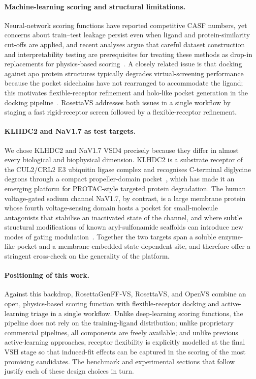 \documentclass[11pt]{article}
\begin{document}
\paragraph{Machine-learning scoring and structural limitations.}
Neural-network scoring functions have reported competitive CASF numbers,
yet concerns about train--test leakage persist even when ligand and
protein-similarity cut-offs are applied, and recent analyses argue that
careful dataset construction and interpretability testing are prerequisites
for treating these methods as drop-in replacements for physics-based
scoring~\citep{scantlebury2023pointvs}. A closely related issue is that
docking against apo protein structures typically degrades
virtual-screening performance because the pocket sidechains have not
rearranged to accommodate the ligand; this motivates flexible-receptor
refinement and holo-like pocket generation in the
docking pipeline~\citep{guterres2020apo}. RosettaVS addresses both
issues in a single workflow by staging a fast rigid-receptor screen
followed by a flexible-receptor refinement.

\paragraph{KLHDC2 and NaV1.7 as test targets.}
We chose KLHDC2 and NaV1.7 VSD4 precisely because they differ in almost
every biological and biophysical dimension. KLHDC2 is a substrate receptor
of the CUL2/CRL2 E3 ubiquitin ligase complex and recognises C-terminal
diglycine degrons through a compact propeller-domain
pocket~\citep{slusarz2023klhdc3}, which has made it an emerging platform
for PROTAC-style targeted protein degradation. The human voltage-gated
sodium channel NaV1.7, by contrast, is a large membrane protein whose
fourth voltage-sensing domain hosts a pocket for small-molecule
antagonists that stabilise an inactivated state of the channel, and where
subtle structural modifications of known aryl-sulfonamide scaffolds can
introduce new modes of gating
modulation~\citep{wang2015nav17methyl}. Together the two targets span a
soluble enzyme-like pocket and a membrane-embedded state-dependent site,
and therefore offer a stringent cross-check on the generality of the
platform.

\paragraph{Positioning of this work.}
Against this backdrop, RosettaGenFF-VS, RosettaVS, and OpenVS combine an
open, physics-based scoring function with flexible-receptor docking and
active-learning triage in a single workflow. Unlike deep-learning scoring
functions, the pipeline does not rely on the training-ligand distribution;
unlike proprietary commercial pipelines, all components are freely
available; and unlike previous active-learning approaches, receptor
flexibility is explicitly modelled at the final VSH stage so that induced-fit
effects can be captured in the scoring of the most promising candidates.
The benchmark and experimental sections that follow justify each of these
design choices in turn.
\end{document}
